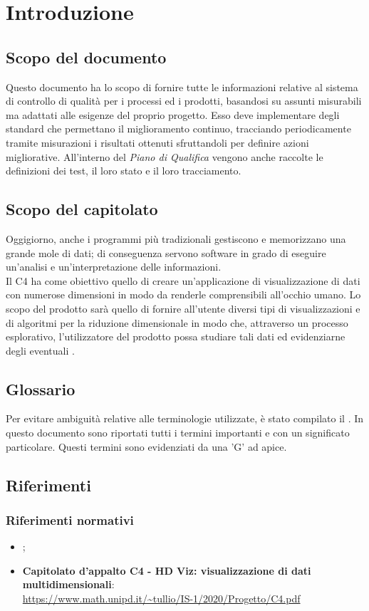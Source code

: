 \section{Introduzione}
\subsection{Scopo del documento}
Questo documento ha lo scopo di fornire tutte le informazioni relative al sistema di controllo di qualità per i processi ed i prodotti, basandosi su assunti misurabili ma adattati alle esigenze del proprio progetto.
Esso deve implementare degli standard che permettano il miglioramento continuo, tracciando periodicamente tramite misurazioni i risultati ottenuti sfruttandoli per definire azioni migliorative. All'interno del \textit{Piano di Qualifica} vengono anche raccolte le definizioni dei test, il loro stato e il loro tracciamento. 

\subsection{Scopo del capitolato}
Oggigiorno, anche i programmi più tradizionali gestiscono e memorizzano una grande mole di dati; di conseguenza servono software in grado di eseguire un'analisi e un'interpretazione delle informazioni.\\
Il  C4 ha come obiettivo quello di creare un'applicazione di visualizzazione di dati con numerose dimensioni in modo da renderle comprensibili all'occhio umano.  Lo scopo del prodotto sarà quello di fornire all'utente diversi tipi di visualizzazioni e di algoritmi per la riduzione dimensionale in modo che, attraverso un processo esplorativo, l'utilizzatore del prodotto possa studiare tali dati ed evidenziarne degli eventuali . 

\subsection{Glossario}
Per evitare ambiguità relative alle terminologie utilizzate, è stato compilato il . In questo documento sono riportati tutti i termini importanti e con un significato particolare. Questi termini sono evidenziati da una 'G' ad apice.

\subsection{Riferimenti}
\subsubsection{Riferimenti normativi}
\begin{itemize}	
\item \textbf{};
	
\item \textbf{Capitolato d'appalto C4 - HD Viz: visualizzazione di dati multidimensionali}:\\
	\textcolor{blue}{\url{https://www.math.unipd.it/~tullio/IS-1/2020/Progetto/C4.pdf}}

\end{itemize}

